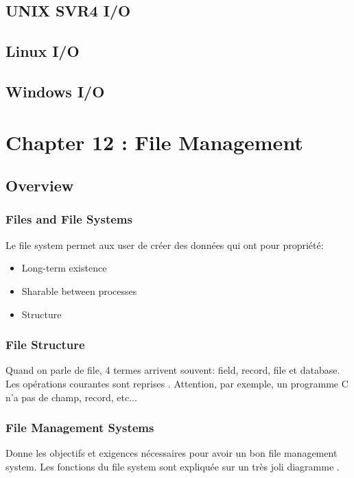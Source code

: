 \subsection{UNIX SVR4 I/O }
\subsection{Linux I/O}
\subsection{Windows I/O}

\newpage


\section{Chapter 12 : File Management}

\subsection{Overview}
\subsubsection{Files and File Systems}
Le file system permet aux user de créer des données qui ont pour propriété:
\begin{itemize}
  \item Long-term existence
  \item Sharable between processes
  \item Structure
\end{itemize}

\subsubsection{File Structure}
Quand on parle de file, 4 termes arrivent souvent: field, record, file et database. Les opérations courantes sont reprises \cite[p.~523]{stallings}.
Attention, par exemple, un programme C n'a pas de champ, record, etc...

\subsubsection{File Management Systems}
Donne les objectifs et exigences nécessaires pour avoir un bon file management system. Les fonctions du file system sont expliquée sur un très joli diagramme \cite[p.~526]{stallings}.

